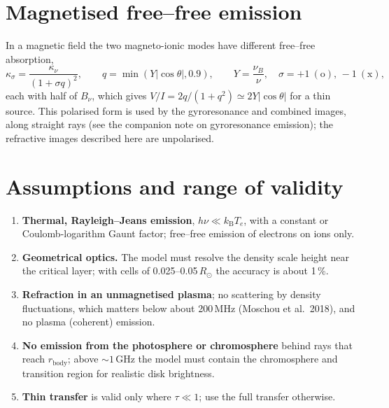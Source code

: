 \documentclass[11pt,a4paper]{article}
\newcommand{\kB}{k_\mathrm{B}}
\newcommand{\rsun}{R_\odot}
\begin{document}
\section{Magnetised free--free emission}\label{sec:mag}

In a magnetic field the two magneto-ionic modes have different free--free absorption,
\begin{equation}
  \kappa_\sigma=\frac{\kappa_\nu}{(1+\sigma q)^2},\qquad q=\min(Y|\cos\theta|,0.9),\qquad
  Y=\frac{\nu_B}{\nu},\quad \sigma=+1\ (\text{o}),\,-1\ (\text{x}),
\end{equation}
each with half of $B_\nu$, which gives $V/I=2q/(1+q^2)\simeq2Y|\cos\theta|$ for a thin source. This
polarised form is used by the gyroresonance and combined images, along straight rays (see the
companion note on gyroresonance emission); the refractive images described here are unpolarised.

\section{Assumptions and range of validity}\label{sec:limits}

\begin{enumerate}
  \item \textbf{Thermal, Rayleigh--Jeans emission}, $h\nu\ll\kB T_e$, with a constant or
        Coulomb-logarithm Gaunt factor; free--free emission of electrons on ions only.
  \item \textbf{Geometrical optics.} The model must resolve the density scale height near the
        critical layer; with cells of 0.025--0.05\,$\rsun$ the accuracy is about 1\,\%.
  \item \textbf{Refraction in an unmagnetised plasma}; no scattering by density
        fluctuations, which matters below about 200\,MHz (Moschou et al.\ 2018), and no plasma
        (coherent) emission.
  \item \textbf{No emission from the photosphere or chromosphere} behind rays that reach
        $r_\text{body}$; above $\sim1$\,GHz the model must contain the chromosphere and transition
        region for realistic disk brightness.
  \item \textbf{Thin transfer} is valid only where $\tau\ll1$; use the full transfer otherwise.
\end{enumerate}
\end{document}
